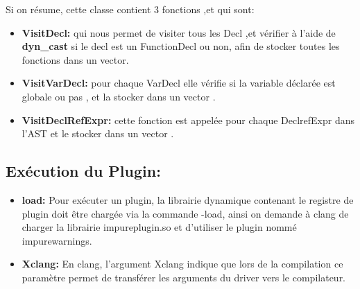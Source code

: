\documentclass[12pt,titlepage]{article}
\begin{document}
Si on résume, cette  classe contient 3 fonctions ,et qui sont: 
\begin{itemize}
    \item  \textbf{VisitDecl:} qui nous permet de visiter tous les Decl ,et vérifier à l’aide de \textbf{ dyn\_cast} si le decl est un FunctionDecl ou non, afin de stocker toutes les fonctions dans  un vector.
\item \textbf{VisitVarDecl:} pour chaque VarDecl elle vérifie si la variable déclarée est globale ou pas , et la stocker dans un vector .
\item \textbf{VisitDeclRefExpr:} cette fonction est appelée pour chaque DeclrefExpr dans l’AST et le stocker dans un vector .
\end{itemize}

\subsection{ Exécution du Plugin:}

\begin{itemize}
    \item \textbf{load:}
Pour exécuter un plugin, la librairie dynamique contenant le registre de plugin doit être chargée via la commande -load, ainsi on demande à clang de charger la librairie impureplugin.so et d'utiliser le plugin nommé  impurewarnings.
\item \textbf{ Xclang:}
En clang, l'argument Xclang indique que lors de la compilation ce paramètre permet de transférer les arguments du driver vers le compilateur.
\end{itemize}
\end{document}
